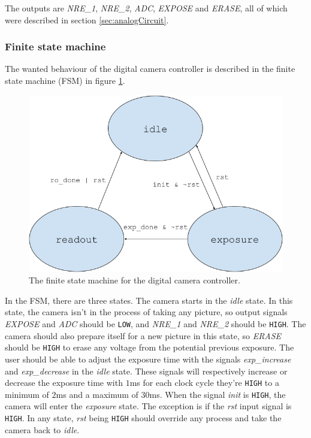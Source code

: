 The outputs are \emph{NRE\_1}, \emph{NRE\_2}, \emph{ADC}, \emph{EXPOSE} and \emph{ERASE}, all of which were described in section \ref{sec:analogCircuit}.

\subsubsection{Finite state machine}
The wanted behaviour of the digital camera controller is described in the finite state machine (FSM) in figure \ref{fig:fsm}.

\begin{figure}[H]
    \centering
    \includegraphics[width=\textwidth]{graphs/fsm.png}
    \caption{The finite state machine for the digital camera controller.}
    \label{fig:fsm}
\end{figure}

In the FSM, there are three states. The camera starts in the \emph{idle} state. In this state, the camera isn't in the process of taking any picture, so output signals \emph{EXPOSE} and \emph{ADC} should be \verb|LOW|, and \emph{NRE\_1} and \emph{NRE\_2} should be \verb|HIGH|. The camera should also prepare itself for a new picture in this state, so \emph{ERASE} should be \verb|HIGH| to erase any voltage from the potential previous exposure. The user should be able to adjust the exposure time with the signals \emph{exp\_increase} and \emph{exp\_decrease} in the \emph{idle} state. These signals will respectively increase or decrease the exposure time with $1$ms for each clock cycle they're \verb|HIGH| to a minimum of $2$ms and a maximum of $30$ms. When the signal \emph{init} is \verb|HIGH|, the camera will enter the \emph{exposure} state. The exception is if the \emph{rst} input signal is \verb|HIGH|. In any state, \emph{rst} being \verb|HIGH| should override any process and take the camera back to \emph{idle}.

